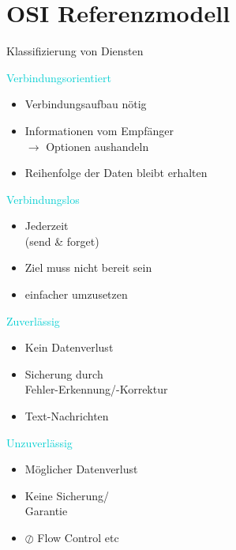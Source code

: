 \section{OSI Referenzmodell}

\begin{concept}{Klassifizierung von Diensten}
    
    \begin{minipage}{0.6\linewidth}
        \textcolor{darkturquoise}{Verbindungsorientiert}
        \begin{itemize}
            \item Verbindungsaufbau nötig
            \item Informationen vom Empfänger\\ $\rightarrow$ Optionen aushandeln
            \item Reihenfolge der Daten bleibt erhalten
        \end{itemize}
    \end{minipage}
    \begin{minipage}{0.39\linewidth}
        \textcolor{darkturquoise}{Verbindungslos}
        \begin{itemize}
            \item Jederzeit\\ (send \& forget)
            \item Ziel muss nicht bereit sein
            \item einfacher umzusetzen
        \end{itemize}
    \end{minipage}

    \vspace{0.5mm}

    \begin{minipage}{0.6\linewidth}
        \textcolor{darkturquoise}{Zuverlässig}
        \begin{itemize}
            \item Kein Datenverlust
            \item Sicherung durch\\Fehler-Erkennung/-Korrektur
            \item Text-Nachrichten
        \end{itemize}
    \end{minipage}
    \begin{minipage}{0.39\linewidth}
        \textcolor{darkturquoise}{Unzuverlässig}
        \begin{itemize}
            \item Möglicher Datenverlust
            \item Keine Sicherung/ \\ Garantie
            \item $\oslash$ Flow Control etc
        \end{itemize}
    \end{minipage}


\end{concept}

